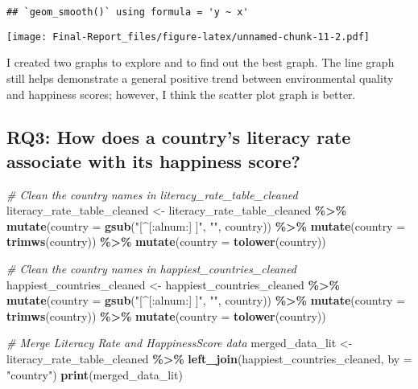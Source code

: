 \documentclass[
]{article}
\newenvironment{Shaded}{\begin{snugshade}}{\end{snugshade}}
\newcommand{\AttributeTok}[1]{\textcolor[rgb]{0.13,0.29,0.53}{#1}}
\newcommand{\CommentTok}[1]{\textcolor[rgb]{0.56,0.35,0.01}{\textit{#1}}}
\newcommand{\FunctionTok}[1]{\textcolor[rgb]{0.13,0.29,0.53}{\textbf{#1}}}
\newcommand{\NormalTok}[1]{#1}
\newcommand{\OtherTok}[1]{\textcolor[rgb]{0.56,0.35,0.01}{#1}}
\newcommand{\SpecialCharTok}[1]{\textcolor[rgb]{0.81,0.36,0.00}{\textbf{#1}}}
\newcommand{\StringTok}[1]{\textcolor[rgb]{0.31,0.60,0.02}{#1}}
\begin{document}
\begin{verbatim}
## `geom_smooth()` using formula = 'y ~ x'
\end{verbatim}

\texttt{[image: Final-Report\_files/figure-latex/unnamed-chunk-11-2.pdf]}

I created two graphs to explore and to find out the best graph. The line
graph still helps demonstrate a general positive trend between
environmental quality and happiness scores; however, I think the scatter
plot graph is better.

\subsection{RQ3: How does a country's literacy rate associate with its
happiness
score?}\label{rq3-how-does-a-countrys-literacy-rate-associate-with-its-happiness-score}

\begin{Shaded}
\begin{Highlighting}[]
\CommentTok{\# Clean the country names in literacy\_rate\_table\_cleaned}
\NormalTok{literacy\_rate\_table\_cleaned }\OtherTok{\textless{}{-}}\NormalTok{ literacy\_rate\_table\_cleaned }\SpecialCharTok{\%\textgreater{}\%}
  \FunctionTok{mutate}\NormalTok{(}\AttributeTok{country =} \FunctionTok{gsub}\NormalTok{(}\StringTok{"[\^{}[:alnum:] ]"}\NormalTok{, }\StringTok{""}\NormalTok{, country)) }\SpecialCharTok{\%\textgreater{}\%} 
  \FunctionTok{mutate}\NormalTok{(}\AttributeTok{country =} \FunctionTok{trimws}\NormalTok{(country)) }\SpecialCharTok{\%\textgreater{}\%}                    
  \FunctionTok{mutate}\NormalTok{(}\AttributeTok{country =} \FunctionTok{tolower}\NormalTok{(country))                    }

\CommentTok{\# Clean the country names in happiest\_countries\_cleaned}
\NormalTok{happiest\_countries\_cleaned }\OtherTok{\textless{}{-}}\NormalTok{ happiest\_countries\_cleaned }\SpecialCharTok{\%\textgreater{}\%}
  \FunctionTok{mutate}\NormalTok{(}\AttributeTok{country =} \FunctionTok{gsub}\NormalTok{(}\StringTok{"[\^{}[:alnum:] ]"}\NormalTok{, }\StringTok{""}\NormalTok{, country)) }\SpecialCharTok{\%\textgreater{}\%} 
  \FunctionTok{mutate}\NormalTok{(}\AttributeTok{country =} \FunctionTok{trimws}\NormalTok{(country)) }\SpecialCharTok{\%\textgreater{}\%}                   
  \FunctionTok{mutate}\NormalTok{(}\AttributeTok{country =} \FunctionTok{tolower}\NormalTok{(country))                    }

\CommentTok{\# Merge Literacy Rate and HappinessScore data}
\NormalTok{merged\_data\_lit }\OtherTok{\textless{}{-}}\NormalTok{ literacy\_rate\_table\_cleaned }\SpecialCharTok{\%\textgreater{}\%}
  \FunctionTok{left\_join}\NormalTok{(happiest\_countries\_cleaned, }\AttributeTok{by =} \StringTok{"country"}\NormalTok{)}
\FunctionTok{print}\NormalTok{(merged\_data\_lit)}
\end{Highlighting}
\end{Shaded}
\end{document}
